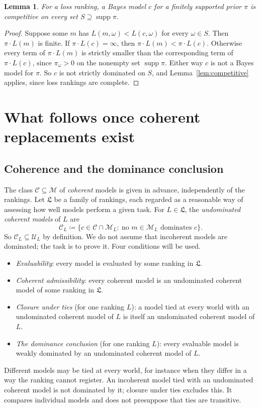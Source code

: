 \documentclass[11pt]{article}
\newtheorem{lemma}[theorem]{Lemma}
\theoremstyle{definition}
\theoremstyle{remark}
\newcommand{\M}{\mathcal M}
\newcommand{\C}{\mathcal C}
\newcommand{\U}{\mathcal U}
\newcommand{\Lf}{\mathfrak L}
\newcommand{\supp}{\operatorname{supp}}
\begin{document}
\begin{lemma}\label{lem:bayes-competitive}
For a loss ranking, a Bayes model $c$ for a finitely supported prior $\pi$ is competitive on every set $S\supseteq\supp\pi$.
\end{lemma}
\begin{proof}
Suppose some $m$ has $L(m,\omega)<L(c,\omega)$ for every $\omega\in S$. Then $\pi\cdot L(m)$ is finite. If $\pi\cdot L(c)=\infty$, then $\pi\cdot L(m)<\pi\cdot L(c)$. Otherwise every term of $\pi\cdot L(m)$ is strictly smaller than the corresponding term of $\pi\cdot L(c)$, since $\pi_\omega>0$ on the nonempty set $\supp\pi$. Either way $c$ is not a Bayes model for $\pi$. So $c$ is not strictly dominated on $S$, and Lemma~\ref{lem:competitive} applies, since loss rankings are complete.
\end{proof}

\section{What follows once coherent replacements exist}\label{sec:conclusion}

\subsection{Coherence and the dominance conclusion}
The class $\C\subseteq\M$ of \emph{coherent} models is given in advance, independently of the rankings. Let $\Lf$ be a family of rankings, each regarded as a reasonable way of assessing how well models perform a given task. For $L\in\Lf$, the \emph{undominated coherent models} of $L$ are
\[
\C_L\coloneqq\{c\in\C\cap\M_L:\ \text{no } m\in\M_L \text{ dominates } c\}.
\]
So $\C_L\subseteq\U_L$ by definition. We do not assume that incoherent models are dominated; the task is to prove it. Four conditions will be used.
\begin{itemize}[leftmargin=*]
\item \emph{Evaluability}: every model is evaluated by some ranking in $\Lf$.
\item \emph{Coherent admissibility}: every coherent model is an undominated coherent model of some ranking in $\Lf$.
\item \emph{Closure under ties} (for one ranking $L$): a model tied at every world with an undominated coherent model of $L$ is itself an undominated coherent model of $L$.
\item \emph{The dominance conclusion} (for one ranking $L$): every evaluable model is weakly dominated by an undominated coherent model of $L$.
\end{itemize}
Different models may be tied at every world, for instance when they differ in a way the ranking cannot register. An incoherent model tied with an undominated coherent model is not dominated by it; closure under ties excludes this. It compares individual models and does not presuppose that ties are transitive.
\end{document}
